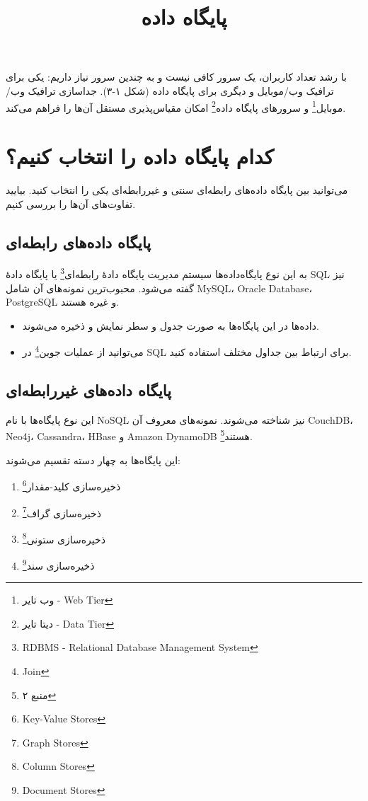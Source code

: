 \documentclass[12pt,a4paper]{article}
\title{پایگاه داده}
\author{}
\date{}
\begin{document}
\maketitle

با رشد تعداد کاربران، یک سرور کافی نیست و به چندین سرور نیاز داریم: یکی برای ترافیک وب/موبایل و دیگری برای پایگاه داده (شکل ۱-۳). جداسازی ترافیک وب/موبایل\footnote{وب تایر - Web Tier} و سرورهای پایگاه داده\footnote{دیتا تایر - Data Tier} امکان مقیاس‌پذیری مستقل آن‌ها را فراهم می‌کند.

\section{کدام پایگاه داده را انتخاب کنیم؟}

می‌توانید بین پایگاه داده‌های رابطه‌ای سنتی و غیررابطه‌ای یکی را انتخاب کنید. بیایید تفاوت‌های آن‌ها را بررسی کنیم.

\subsection{پایگاه داده‌های رابطه‌ای}

به این نوع پایگاه‌داده‌ها سیستم مدیریت پایگاه دادهٔ رابطه‌ای\footnote{RDBMS - Relational Database Management System} یا پایگاه دادهٔ SQL نیز گفته می‌شود. محبوب‌ترین نمونه‌های آن شامل MySQL، Oracle Database، PostgreSQL و غیره هستند.

\begin{itemize}
\item داده‌ها در این پایگاه‌ها به صورت جدول و سطر نمایش و ذخیره می‌شوند.
\item می‌توانید از عملیات جوین\footnote{Join} در SQL برای ارتباط بین جداول مختلف استفاده کنید.
\end{itemize}

\subsection{پایگاه داده‌های غیررابطه‌ای}

این نوع پایگاه‌ها با نام NoSQL نیز شناخته می‌شوند. نمونه‌های معروف آن CouchDB، Neo4j، Cassandra، HBase و Amazon DynamoDB هستند\footnote{منبع ۲}.

این پایگاه‌ها به چهار دسته تقسیم می‌شوند:

\begin{enumerate}
\item ذخیره‌سازی کلید-مقدار\footnote{Key-Value Stores}
\item ذخیره‌سازی گراف\footnote{Graph Stores}  
\item ذخیره‌سازی ستونی\footnote{Column Stores}
\item ذخیره‌سازی سند\footnote{Document Stores}
\end{enumerate}
\end{document}
